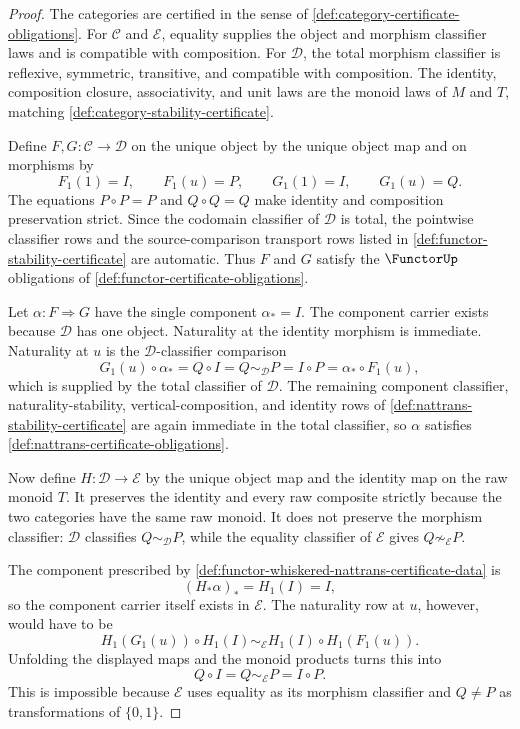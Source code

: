 \begin{proof}
The categories are certified in the sense of \autoref{def:category-certificate-obligations}. For $\mathcal C$ and $\mathcal E$, equality supplies the object and morphism classifier laws and is compatible with composition. For $\mathcal D$, the total morphism classifier is reflexive, symmetric, transitive, and compatible with composition. The identity, composition closure, associativity, and unit laws are the monoid laws of $M$ and $T$, matching \autoref{def:category-stability-certificate}.

Define $F,G:\mathcal C\to\mathcal D$ on the unique object by the unique object map and on morphisms by
$$
F_1(1)=I,\qquad F_1(u)=P,
\qquad
G_1(1)=I,\qquad G_1(u)=Q.
$$
The equations $P\circ P=P$ and $Q\circ Q=Q$ make identity and composition preservation strict. Since the codomain classifier of $\mathcal D$ is total, the pointwise classifier rows and the source-comparison transport rows listed in \autoref{def:functor-stability-certificate} are automatic. Thus $F$ and $G$ satisfy the $\FunctorUp$ obligations of \autoref{def:functor-certificate-obligations}.

Let $\alpha:F\Rightarrow G$ have the single component $\alpha_{\ast}=I$. The component carrier exists because $\mathcal D$ has one object. Naturality at the identity morphism is immediate. Naturality at $u$ is the $\mathcal D$-classifier comparison
$$
G_1(u)\circ \alpha_{\ast}
=
Q\circ I
=
Q
\sim_{\mathcal D}
P
=
I\circ P
=
\alpha_{\ast}\circ F_1(u),
$$
which is supplied by the total classifier of $\mathcal D$. The remaining component classifier, naturality-stability, vertical-composition, and identity rows of \autoref{def:nattrans-stability-certificate} are again immediate in the total classifier, so $\alpha$ satisfies \autoref{def:nattrans-certificate-obligations}.

Now define $H:\mathcal D\to\mathcal E$ by the unique object map and the identity map on the raw monoid $T$. It preserves the identity and every raw composite strictly because the two categories have the same raw monoid. It does not preserve the morphism classifier: $\mathcal D$ classifies $Q\sim_{\mathcal D}P$, while the equality classifier of $\mathcal E$ gives $Q\not\sim_{\mathcal E}P$.

The component prescribed by \autoref{def:functor-whiskered-nattrans-certificate-data} is
$$
(H_{\ast}\alpha)_{\ast}=H_1(I)=I,
$$
so the component carrier itself exists in $\mathcal E$. The naturality row at $u$, however, would have to be
$$
H_1(G_1(u))\circ H_1(I)
\sim_{\mathcal E}
H_1(I)\circ H_1(F_1(u)).
$$
Unfolding the displayed maps and the monoid products turns this into
$$
Q\circ I
=
Q
\sim_{\mathcal E}
P
=
I\circ P.
$$
This is impossible because $\mathcal E$ uses equality as its morphism classifier and $Q\ne P$ as transformations of $\{0,1\}$.


\end{proof}
